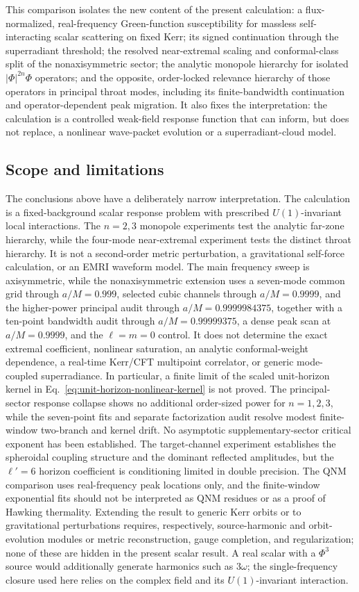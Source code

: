 \documentclass[aps,prd,twocolumn,10pt,nofootinbib,superscriptaddress,floatfix]{revtex4-2}
\begin{document}
This comparison isolates the new content of the present calculation: a
flux-normalized, real-frequency Green-function susceptibility for massless
self-interacting scalar scattering on fixed Kerr; its signed continuation
through the superradiant threshold; the resolved near-extremal scaling and
conformal-class split of the nonaxisymmetric sector; the analytic monopole
hierarchy for isolated $|\Phi|^{2n}\Phi$ operators; and the opposite,
order-locked relevance hierarchy of those operators in principal throat
modes, including its finite-bandwidth continuation and operator-dependent
peak migration.  It also fixes the interpretation: the calculation
is a controlled weak-field response function that can inform, but does not
replace, a nonlinear wave-packet evolution or a superradiant-cloud model.

\subsection{Scope and limitations}

The conclusions above have a deliberately narrow interpretation.  The
calculation is a fixed-background scalar response problem with prescribed
$U(1)$-invariant local interactions.  The $n=2,3$ monopole experiments test
the analytic far-zone hierarchy, while the four-mode near-extremal experiment
tests the distinct throat hierarchy.  It is not a second-order metric perturbation, a
gravitational self-force calculation, or an EMRI waveform model.  The main
frequency sweep is axisymmetric, while the nonaxisymmetric extension uses a
seven-mode common grid through $a/M=0.999$, selected cubic channels through
$a/M=0.9999$, and the higher-power principal audit through
$a/M=0.9999984375$, together with a ten-point bandwidth audit through
$a/M=0.99999375$, a dense peak scan at $a/M=0.9999$, and the $\ell=m=0$
control.  It does not determine the
exact extremal coefficient, nonlinear saturation, an analytic conformal-weight
dependence, a real-time Kerr/CFT multipoint correlator, or generic
mode-coupled superradiance.  In particular, a finite limit of the scaled
unit-horizon kernel in Eq.~\eqref{eq:unit-horizon-nonlinear-kernel} is not
proved.  The principal-sector response collapse shows no additional
order-sized power for $n=1,2,3$, while the seven-point fits and separate
factorization audit resolve modest finite-window two-branch and kernel drift.
No asymptotic supplementary-sector
critical exponent has been established.
The target-channel
experiment establishes the spheroidal
coupling structure and the dominant reflected amplitudes, but the
$\ell'=6$ horizon coefficient is conditioning limited in double precision.
The QNM comparison uses real-frequency peak locations only, and the
finite-window exponential fits should not be interpreted as QNM residues or
as a proof of Hawking thermality.  Extending the result to generic Kerr
orbits or to gravitational perturbations requires, respectively,
source-harmonic and orbit-evolution modules or metric reconstruction, gauge
completion, and regularization; none of these are hidden in the present
scalar result.  A real scalar with a $\Phi^3$ source would additionally generate
harmonics such as $3\omega$; the single-frequency closure used here relies on
the complex field and its $U(1)$-invariant interaction.
\end{document}
